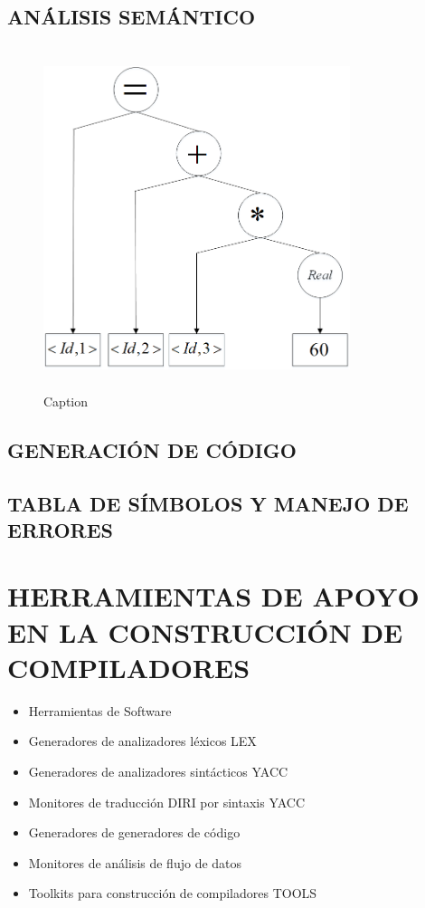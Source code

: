 \subsection{ANÁLISIS SEMÁNTICO}
\begin{figure}[H]
    \centering
    \includegraphics[width=0.8\textwidth, height=10cm,keepaspectratio]{chapters/chapter1/figures/Fig5 Analisis Semantico.png}
    \caption{Caption}
    \label{fig:my_label}
\end{figure}
\subsection{GENERACIÓN DE CÓDIGO}

\subsection{TABLA DE SÍMBOLOS Y MANEJO DE ERRORES}
\section{HERRAMIENTAS DE APOYO EN LA CONSTRUCCIÓN DE COMPILADORES} \label{sec:herraminetasConstruccionCompiladores} 
\begin{itemize}
    \item Herramientas de Software
    \item Generadores de analizadores léxicos LEX
    \item Generadores de analizadores sintácticos YACC
    \item Monitores de traducción DIRI por sintaxis YACC
    \item Generadores de generadores de código
    \item Monitores de análisis de flujo de datos
    \item Toolkits para construcción de compiladores TOOLS
\end{itemize}
